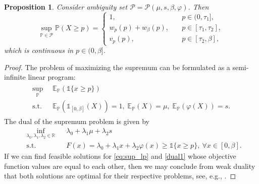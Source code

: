 \documentclass[11pt]{article}
\newtheorem{proposition}{Proposition}[section]
\renewcommand{\P}{\mathbb{P}}
\newcommand{\E}{\mathbb{E}}
\newcommand{\R}{\mathbb{R}}
\newcommand{\bP}{\mathbb{P}}
\newcommand{\cP}{\mathcal{P}}
\newcommand{\bE}{\mathbb{E}}
\newcommand{\1}{\mathds{1}}
\begin{document}
\begin{proposition}\label{prop:sup_tp}
    Consider ambiguity set $\cP = \cP(\mu,s,\beta,\varphi)$. Then
    \begin{equation}
    \sup_{\bP \in \cP}\bP(X \geq p)=
    \begin{cases}
     1, \quad &  p\in(0,\tau_1], \\
     w_p(p) + w_{\beta}(p), \quad & p\in[\tau_1,\tau_2], \\
     v_p(p), & p \in [\tau_2,\beta],
    \end{cases}
\end{equation}\label{eq:tailsup}
which is continuous in $p \in (0,\beta]$.
\end{proposition}
\begin{proof}
The problem of maximizing the supremum can be formulated as a semi-infinite  linear program:
\begin{align}\label{eq:sup_lp}
\begin{array}{ll}
    \sup_\P \; \; & \bE_{\P}(\1{\{x \geq p\}}) \\
    \text{s.t.} \; \; & \E_{\P}(\1_{[0,\beta]}(X)) = 1,\; \E_{\P}(X) = \mu,\; \E_{\P}(\varphi(X)) = s.
\end{array}
\end{align}
The dual of the supremum problem is given by
    \begin{equation}\label{dual1}
\begin{aligned}
&\inf_{\lambda_0,\lambda_1,\lambda_2 \in \R} &  &\lambda_0 + \lambda_1 \mu+\lambda_2 s\\
&\text{s.t.} &      & F(x) = \lambda_0  +\lambda_1 x+\lambda_2 \varphi(x)  \geq \1{\{x \geq p\}}, \ \forall x\in[0,\beta].
\end{aligned}
\end{equation}
If we can find feasible solutions for \eqref{eq:sup_lp} and \eqref{dual1} whose objective function values are equal to each other, then we may conclude from weak duality that both solutions are optimal for their respective problems, see, e.g., \cite{popescu2005semidefinite}.



\end{proof}
\end{document}

